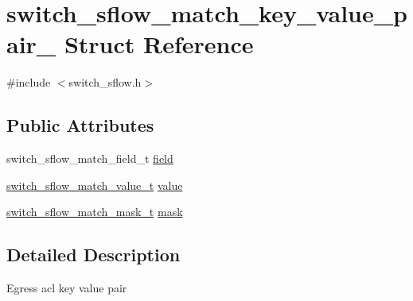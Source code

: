 \hypertarget{structswitch__sflow__match__key__value__pair__}{\section{switch\+\_\+sflow\+\_\+match\+\_\+key\+\_\+value\+\_\+pair\+\_\+ Struct Reference}
\label{structswitch__sflow__match__key__value__pair__}
}


{\ttfamily \#include $<$switch\+\_\+sflow.\+h$>$}

\subsection*{Public Attributes}
\begin{DoxyCompactItemize}
\item 
switch\+\_\+sflow\+\_\+match\+\_\+field\+\_\+t \hyperlink{structswitch__sflow__match__key__value__pair___abbbf6be6bc8444f221ebfc0b3254121f}{field}
\item 
\hyperlink{unionswitch__sflow__match__value__}{switch\+\_\+sflow\+\_\+match\+\_\+value\+\_\+t} \hyperlink{structswitch__sflow__match__key__value__pair___a56e342926a968adae8e382b516d40142}{value}
\item 
\hyperlink{unionswitch__sflow__match__mask__}{switch\+\_\+sflow\+\_\+match\+\_\+mask\+\_\+t} \hyperlink{structswitch__sflow__match__key__value__pair___a830d6fe4f07c3e925c867f1573a688d2}{mask}
\end{DoxyCompactItemize}


\subsection{Detailed Description}
Egress acl key value pair 


